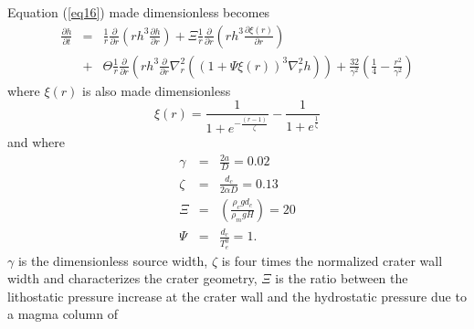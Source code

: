 Equation (\ref{eq16}) made dimensionless becomes
\begin{eqnarray}    \frac{\partial     h}{\partial    t}&=&\frac{1}{r}
  \frac{\partial}{\partial r}\left  (rh^{3} \frac{\partial h}{\partial
      r} \right)+ \Xi \frac{1}{r} \frac{\partial}{\partial r}\left
                                                            (   rh^{3}\frac{\partial    \xi(r)}{\partial   r}\right   )\nonumber\\
                                                        &+&\Theta
                                                            \frac{1}{r}\frac{\partial}{\partial
                                                            r}\left
                                                            (   rh^{3}
                                                            \frac{\partial}{\partial
                                                            r}
                                                            \nabla^{2}_{r}\left
                                                            ((1+\Psi
                                                            \xi(r))^{3}\nabla^{2}_{r}h
                                                            \right )\right)+
                                                            \frac{32}{\gamma^{2}}
                                                            \left(\frac{1}{4}-\frac{r^{2}}{\gamma^{2}}\right)
                                                            \label{eq21}
\end{eqnarray}
where $\xi(r)$ is also made dimensionless
\begin{equation}
  \xi(r)=\frac{1}{1+e^{-\frac{(r-1)}{\zeta}}}-\frac{1}{1+e^{\frac{1}{\zeta}}}\label{eqqqq}
\end{equation}
and where
\begin{eqnarray}
  \label{Dimensionless1} 
  \gamma&=&\frac{2a}{D}= 0.02\label{n1}\\
  \zeta&=&\frac{d_c}{2\alpha D}=0.13
           \label{n2}\\ \Xi&=&
                               \left(\frac{\rho_{c}gd_{c}}{\rho_{m}gH}\right )
                               = 20 \label{n3}\\
  \Psi&=&\frac{d_{c}}{T_{e}^0} = 1\label{n4}. 
\end{eqnarray}
$\gamma$ is the dimensionless source  width, $\zeta$ is four times the
normalized crater  wall width  and characterizes the  crater geometry,
$\Xi$ is  the ratio between  the lithostatic pressure increase  at the
crater wall  and the  hydrostatic pressure  due to  a magma  column of
